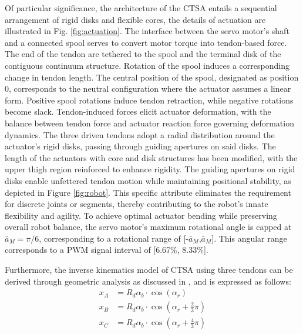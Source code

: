 Of particular significance, the architecture of the \ac{CTSA} entails a sequential arrangement of rigid disks and flexible cores, the details of actuation are illustrated in Fig. \ref{fig:actuation}. The interface between the servo motor's shaft and a connected spool serves to convert motor torque into tendon-based force. The end of the tendon are tethered to the spool and the terminal disk of the contiguous continuum structure. Rotation of the spool induces a corresponding change in tendon length. The central position of the spool, designated as position 0, corresponds to the neutral configuration where the actuator assumes a linear form. Positive spool rotations induce tendon retraction, while negative rotations become slack. Tendon-induced forces elicit actuator deformation, with the balance between tendon force and actuator reaction force governing deformation dynamics. The three driven tendons adopt a radial distribution around the actuator's rigid disks, passing through guiding apertures on said disks. The length of the actuators with core and disk structures has been modified, with the upper thigh region reinforced to enhance rigidity. The guiding apertures on rigid disks enable unfettered tendon motion while maintaining positional stability, as depicted in Figure \ref{fig:robot}. This specific attribute eliminates the requirement for discrete joints or segments, thereby contributing to the robot's innate flexibility and agility. To achieve optimal actuator bending while preserving overall robot balance, the servo motor's maximum rotational angle is capped at $\bar{a}_M = \pi/6$, corresponding to a rotational range of [-$\bar{a}_M$,$\bar{a}_M$]. This angular range corresponds to a \ac{PWM} signal interval of [6.67\%, 8.33\%].


Furthermore, the inverse kinematics model of \ac{CTSA} using three tendons can be derived through geometric analysis as discussed in \cite{muralidharanSoftQuadrupedRobot2021}, and is expressed as follows:
\begin{equation}
    \begin{aligned}
    x_A &= R_d\alpha_b\cdot{\cos(\alpha_r)} \\
    x_B &= R_d\alpha_b\cdot{\cos(\alpha_r+\frac{2}{3}\pi)} \\
    x_C &= R_d\alpha_b\cdot{\cos(\alpha_r+\frac{4}{3}\pi)}
    \end{aligned}
    \label{eq:value2motor}
\end{equation}

